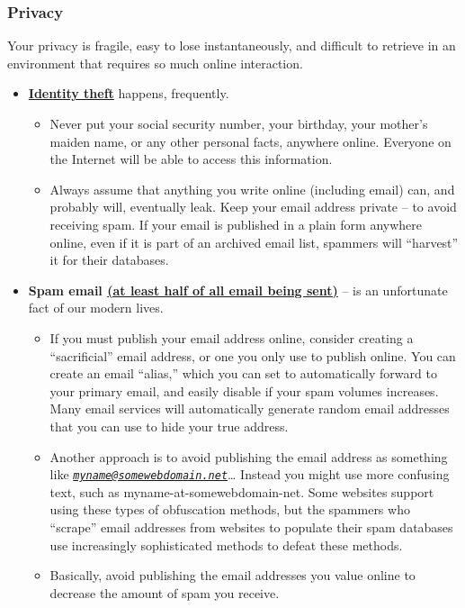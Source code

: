 \documentclass[
]{book}
\providecommand{\tightlist}{%
  \setlength{\itemsep}{0pt}\setlength{\parskip}{0pt}}
\theoremstyle{definition}
\theoremstyle{definition}
\theoremstyle{definition}
\theoremstyle{definition}
\theoremstyle{remark}
\begin{document}
\hypertarget{privacy}{%
\subsubsection*{Privacy}\label{privacy}}

Your privacy is fragile, easy to lose instantaneously, and difficult to retrieve in an environment that requires so much online interaction.

\begin{itemize}
\tightlist
\item
  \href{https://en.wikipedia.org/wiki/Identity_theft}{\textbf{Identity theft}} happens, frequently.

  \begin{itemize}
  \tightlist
  \item
    Never put your social security number, your birthday, your mother's maiden name, or any other personal facts, anywhere online. Everyone on the Internet will be able to access this information.\\
  \item
    Always assume that anything you write online (including email) can, and probably will, eventually leak. Keep your email address private -- to avoid receiving spam. If your email is published in a plain form anywhere online, even if it is part of an archived email list, spammers will ``harvest'' it for their databases.\\
  \end{itemize}
\item
  \textbf{Spam email \href{https://securelist.com/spam-report-2019/96527/}{(at least half of all email being sent)}} -- is an unfortunate fact of our modern lives.

  \begin{itemize}
  \tightlist
  \item
    If you must publish your email address online, consider creating a ``sacrificial'' email address, or one you only use to publish online. You can create an email ``alias,'' which you can set to automatically forward to your primary email, and easily disable if your spam volumes increases. Many email services will automatically generate random email addresses that you can use to hide your true address.
  \item
    Another approach is to avoid publishing the email address as something like \emph{\href{mailto:myname@somewebdomain.net}{\nolinkurl{myname@somewebdomain.net}}}\ldots{} Instead you might use more confusing text, such as myname-at-somewebdomain-net. Some websites support using these types of obfuscation methods, but the spammers who ``scrape'' email addresses from websites to populate their spam databases use increasingly sophisticated methods to defeat these methods.\\
  \item
    Basically, avoid publishing the email addresses you value online to decrease the amount of spam you receive.
  \end{itemize}
\end{itemize}
\end{document}
